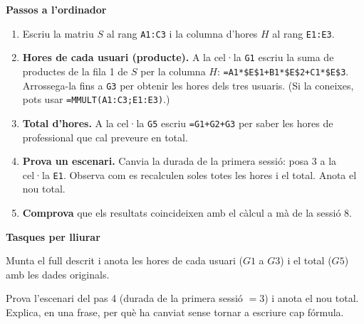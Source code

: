\begin{idea}
\textbf{Passos a l'ordinador}
\begin{enumerate}[leftmargin=1.8em, itemsep=3pt]
  \item Escriu la matriu $S$ al rang \texttt{A1:C3} i la columna d'hores $H$ al
        rang \texttt{E1:E3}.
  \item \textbf{Hores de cada usuari (producte).} A la cel·la \texttt{G1} escriu
        la suma de productes de la fila 1 de $S$ per la columna $H$:
        \texttt{=A1*\$E\$1+B1*\$E\$2+C1*\$E\$3}. Arrossega-la fins a \texttt{G3}
        per obtenir les hores dels tres usuaris. (Si la coneixes, pots usar
        \texttt{=MMULT(A1:C3;E1:E3)}.)
  \item \textbf{Total d'hores.} A la cel·la \texttt{G5} escriu \texttt{=G1+G2+G3}
        per saber les hores de professional que cal preveure en total.
  \item \textbf{Prova un escenari.} Canvia la durada de la primera sessió: posa $3$
        a la cel·la \texttt{E1}. Observa com es recalculen soles totes les hores i
        el total. Anota el nou total.
  \item \textbf{Comprova} que els resultats coincideixen amb el càlcul a mà de la
        sessió 8.
\end{enumerate}
\end{idea}

\textbf{Tasques per lliurar}
\begin{exercicis}
\begin{exlist}
  \item Munta el full descrit i anota les hores de cada usuari ($G1$ a $G3$) i el
        total ($G5$) amb les dades originals.
  \item Prova l'escenari del pas 4 (durada de la primera sessió $=3$) i anota el
        nou total. Explica, en una frase, per què ha canviat sense tornar a
        escriure cap fórmula.
\end{exlist}
\end{exercicis}

